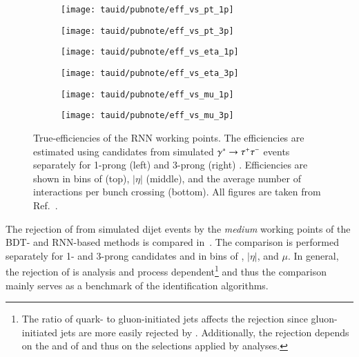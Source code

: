 \begin{figure}[htbp]

  \begin{subfigure}{0.498\textwidth}
    \texttt{[image: tauid/pubnote/eff\_vs\_pt\_1p]}
    \subcaption{}%
    \label{fig:tauid_truetau_eff_a}
  \end{subfigure}\hfill%
  \begin{subfigure}{0.498\textwidth}
    \texttt{[image: tauid/pubnote/eff\_vs\_pt\_3p]}
    \subcaption{}%
    \label{fig:tauid_truetau_eff_b}
  \end{subfigure}

  \begin{subfigure}{0.498\textwidth}
    \texttt{[image: tauid/pubnote/eff\_vs\_eta\_1p]}
    \subcaption{}
  \end{subfigure}\hfill%
  \begin{subfigure}{0.498\textwidth}
    \texttt{[image: tauid/pubnote/eff\_vs\_eta\_3p]}
    \subcaption{}
  \end{subfigure}

  \begin{subfigure}{0.498\textwidth}
    \texttt{[image: tauid/pubnote/eff\_vs\_mu\_1p]}
    \subcaption{}
  \end{subfigure}\hfill%
  \begin{subfigure}{0.498\textwidth}
    \texttt{[image: tauid/pubnote/eff\_vs\_mu\_3p]}
    \subcaption{}
  \end{subfigure}

  \caption[True-\tauhadvis efficiencies of the RNN \tauid working
  points]{True-\tauhadvis efficiencies of the RNN \tauid working points. The
    efficiencies are estimated using \tauhadvis candidates from simulated
    $\gamma^{*} \to \tau^{+} \tau^{-}$ events separately for 1-prong (left) and 3-prong
    (right) \tauhadvis. Efficiencies are shown in bins of \tauhadvis \pT (top),
    \tauhadvis $|\eta|$ (middle), and the average number of interactions per
    bunch crossing (bottom). All figures are taken from
    Ref.~\cite{ATL-PHYS-PUB-2019-033}.}%
  \label{fig:tauid_truetau_eff}
\end{figure}

The rejection of \faketauhadvis from simulated dijet events by the \emph{medium}
\tauid working points of the BDT- and RNN-based methods is compared
in~. The comparison is performed separately for 1-
and 3-prong \tauhadvis candidates and in bins of \tauhadvis \pT, \tauhadvis
$|\eta|$, and $\mu$. In general, the \faketauhadvis rejection of \tauid is
analysis and process dependent\footnote{The ratio of quark- to gluon-initiated
  jets affects the \faketauhadvis rejection since gluon-initiated jets are more
  easily rejected by \tauid. Additionally, the rejection depends on the \pT and
  \Ntracks of \faketauhadvis and thus on the selections applied by analyses.}
and thus the comparison mainly serves as a benchmark of the identification
algorithms.


